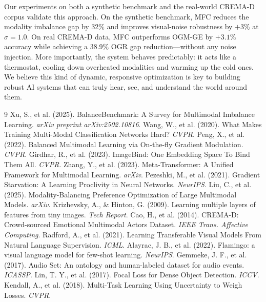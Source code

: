 \documentclass[10pt, twocolumn, letterpaper]{article}
\begin{document}
Our experiments on both a synthetic benchmark and the real-world CREMA-D corpus validate this approach. On the synthetic benchmark, MFC reduces the modality imbalance gap by 32\% and improves visual-noise robustness by $+3\%$ at $\sigma{=}1.0$. On real CREMA-D data, MFC outperforms OGM-GE by $+3.1\%$ accuracy while achieving a 38.9\% OGR gap reduction—without any noise injection. More importantly, the system behaves predictably: it acts like a thermostat, cooling down overheated modalities and warming up the cold ones. We believe this kind of dynamic, responsive optimization is key to building robust AI systems that can truly hear, see, and understand the world around them.

\begin{thebibliography}{9}
Xu, S., et al. (2025). BalanceBenchmark: A Survey for Multimodal Imbalance Learning. \textit{arXiv preprint arXiv:2502.10816}.
Wang, W., et al. (2020). What Makes Training Multi-Modal Classification Networks Hard? \textit{CVPR}.
Peng, X., et al. (2022). Balanced Multimodal Learning via On-the-fly Gradient Modulation. \textit{CVPR}.
Girdhar, R., et al. (2023). ImageBind: One Embedding Space To Bind Them All. \textit{CVPR}.
Zhang, Y., et al. (2023). Meta-Transformer: A Unified Framework for Multimodal Learning. \textit{arXiv}.
Pezeshki, M., et al. (2021). Gradient Starvation: A Learning Proclivity in Neural Networks. \textit{NeurIPS}.
Liu, C., et al. (2025). Modality-Balancing Preference Optimization of Large Multimodal Models. \textit{arXiv}.
Krizhevsky, A., \& Hinton, G. (2009). Learning multiple layers of features from tiny images. \textit{Tech Report}.
Cao, H., et al. (2014). CREMA-D: Crowd-sourced Emotional Multimodal Actors Dataset. \textit{IEEE Trans. Affective Computing}.
Radford, A., et al. (2021). Learning Transferable Visual Models From Natural Language Supervision. \textit{ICML}.
Alayrac, J. B., et al. (2022). Flamingo: a visual language model for few-shot learning. \textit{NeurIPS}.
Gemmeke, J. F., et al. (2017). Audio Set: An ontology and human-labeled dataset for audio events. \textit{ICASSP}.
Lin, T. Y., et al. (2017). Focal Loss for Dense Object Detection. \textit{ICCV}.
Kendall, A., et al. (2018). Multi-Task Learning Using Uncertainty to Weigh Losses. \textit{CVPR}.
\end{thebibliography}
\end{document}
